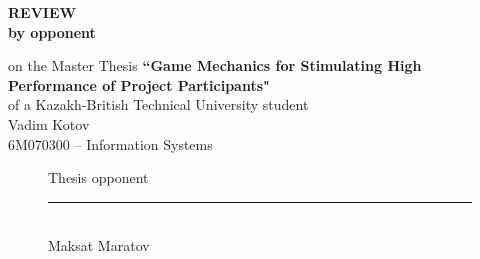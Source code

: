 \begin{titlepage}
\begin{centering}
       \vspace{14pt}

		{\bf
		\MakeUppercase{Review}\\
		by opponent\\
		}

		\vspace{14pt}
		
		on the Master Thesis {\bf``Game Mechanics for Stimulating High Performance of Project Participants"}\\
		of a Kazakh-British Technical University student\\
		 Vadim Kotov\\
		 6M070300 -- Information Systems\\
		
		
		\vspace{14pt}
		

	\end{centering}
    
    

		\begin{figure}[ht]
			\begin{minipage}[t]{0.5\linewidth}
				Thesis opponent\\


				\rule{13em}{0.4pt}\\
				Maksat Maratov\\
			\end{minipage}
		\end{figure}
		
	\end{titlepage}